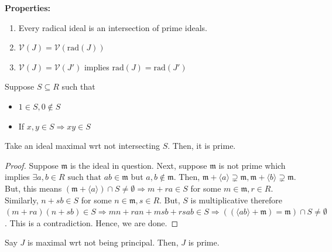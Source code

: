 \documentclass[oneside, 12pt]{scrbook}
\newcommand{\V}{\mathcal{V}}
\newcommand{\m}{\mathfrak{m}}
\theoremstyle{theorem}
\begin{document}
\textbf{Properties:}
\begin{enumerate}
\item Every radical ideal is an intersection of prime ideals.
\item $\V(J) = \V(\mathrm{rad}(J))$ 
\item $\V(J) = \V(J')$ implies $\mathrm{rad}(J) = \mathrm{rad}(J')$
\end{enumerate}

Suppose $S\subseteq R$ such that 
\begin{itemize}
\item $1\in S, 0 \not \in S$
\item If $x,y \in S \Rightarrow xy \in S$
\end{itemize}

\begin{proposition}
Take an ideal maximal wrt not intersecting $S$. Then, it is prime.
\end{proposition}

\begin{proof}
Suppose $\m$ is the ideal in question. Next, suppose $\m$ is not prime which implies  $\exists a,b \in R \text{ such that } ab \in \m$ but $a,b \not \in \m$. Then, $\m + \langle a \rangle \supsetneq \m , \m + \langle b \rangle \supsetneq \m$. But, this means $(\m + \langle a \rangle) \cap S \neq \emptyset \Rightarrow m + ra \in S$ for some $m\in \m , r  \in R$. Similarly, $n + sb \in S$ for some $n \in \m , s \in R$. But, $S$ is multiplicative therefore $(m+ra)(n + sb) \in S \Rightarrow mn + ran + msb + rsab \in S \Rightarrow ((\langle ab \rangle + \m)= \m) \cap S \neq \emptyset$. This is a contradiction. Hence, we are done.  
\end{proof}

\begin{proposition}
Say $J$ is maximal wrt not being principal. Then, $J$ is prime.
\end{proposition}
\end{document}

